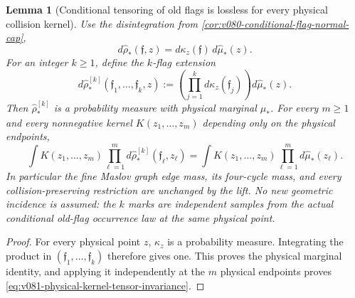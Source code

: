 \documentclass[10pt]{article}
\newtheorem{lemma}[theorem]{Lemma}
\begin{document}
\begin{lemma}[Conditional tensoring of old flags is lossless for every physical collision kernel]
\label{lem:v081-lossless-conditional-flag-tensor}
Use the disintegration from
\cref{cor:v080-conditional-flag-normal-cap},
\[
d\widehat\rho_*(\mathfrak f,z)
=
d\kappa_z(\mathfrak f)\,d\widehat\mu_*(z).
\]
For an integer \(k\ge1\), define the \(k\)-flag extension
\begin{equation}
\label{eq:v081-k-flag-extension}
d\widehat\rho_*^{[k]}(\mathfrak f_1,\ldots,\mathfrak f_k,z)
:=
\left(\prod_{j=1}^k d\kappa_z(\mathfrak f_j)\right)
d\widehat\mu_*(z).
\end{equation}
Then \(\widehat\rho_*^{[k]}\) is a probability measure with physical marginal
\(\widehat\mu_*\).  For every \(m\ge1\) and every nonnegative kernel
\(K(z_1,\ldots,z_m)\) depending only on the physical endpoints,
\begin{equation}
\label{eq:v081-physical-kernel-tensor-invariance}
\boxed{
\int K(z_1,\ldots,z_m)
\prod_{\ell=1}^m
d\widehat\rho_*^{[k]}(\boldsymbol{\mathfrak f}_\ell,z_\ell)
=
\int K(z_1,\ldots,z_m)
\prod_{\ell=1}^m d\widehat\mu_*(z_\ell).
}
\end{equation}
In particular the fine Maslov graph edge mass, its four-cycle mass, and every
collision-preserving restriction are unchanged by the lift.  No new geometric incidence is
assumed: the \(k\) marks are independent samples from the actual conditional old-flag
occurrence law at the same physical point.
\end{lemma}

\begin{proof}
For every physical point \(z\), \(\kappa_z\) is a probability measure.  Integrating the product
in \((\mathfrak f_1,\ldots,\mathfrak f_k)\) therefore gives one.  This proves the physical marginal
identity, and applying it independently at the \(m\) physical endpoints proves
\eqref{eq:v081-physical-kernel-tensor-invariance}.
\end{proof}
\end{document}
